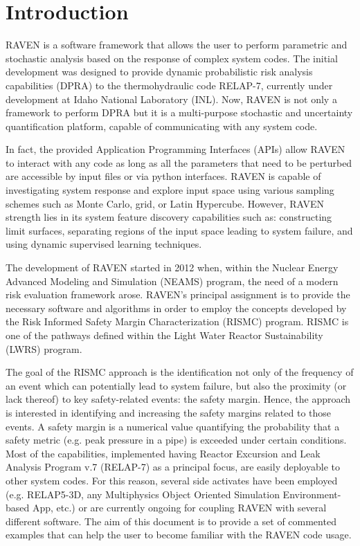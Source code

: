 \section{Introduction}
RAVEN is a software framework that allows the user to perform parametric and stochastic
analysis based on the response of complex system codes.
The initial development was designed to provide dynamic probabilistic risk analysis
capabilities (DPRA) to the thermohydraulic code RELAP-7, currently under development
at Idaho National Laboratory (INL).
Now, RAVEN is not only a framework to perform DPRA but it is a
multi-purpose stochastic and uncertainty quantification platform, capable of communicating with any system code.

In fact, the provided Application Programming
Interfaces (APIs) allow RAVEN to interact with any code as long as all the parameters
that need to be perturbed are accessible by input files or via python
interfaces.
RAVEN is capable of investigating system response and explore input space using various
sampling schemes such as Monte Carlo, grid, or Latin Hypercube.
However, RAVEN strength lies in its system feature discovery capabilities such as: constructing
limit surfaces, separating regions of the input space leading to system failure,
and using dynamic supervised learning techniques.

The development of RAVEN started in 2012 when, within the Nuclear Energy
Advanced Modeling and Simulation (NEAMS) program, the need of a modern
risk evaluation framework arose.
RAVEN's principal assignment is to provide the necessary software and algorithms
in order to employ the concepts developed by the Risk Informed Safety Margin
Characterization (RISMC) program.
RISMC is one of the pathways defined within the Light Water Reactor
Sustainability (LWRS) program.

The goal of the RISMC approach is  the identification not only of the frequency of an
event which can potentially lead to system failure, but also the proximity (or lack
thereof) to key safety-related events: the safety margin.
Hence, the approach is interested in identifying and increasing the safety
margins related to those events.
A safety margin is a numerical value quantifying the probability that a safety
metric (e.g. peak pressure in a pipe) is exceeded under certain conditions.
Most of the capabilities, implemented having Reactor Excursion and Leak Analysis Program v.7 
(RELAP-7) as a principal focus, are
easily deployable to other system codes.
%
For this reason, several side activates have been employed (e.g.  RELAP5-3D, any Multiphysics Object Oriented 
Simulation Environment-based App, etc.)
or are currently ongoing for coupling RAVEN with several different software.
%
The aim of this document is to provide a set of commented examples that can help the user to become familiar 
with the RAVEN code usage.
